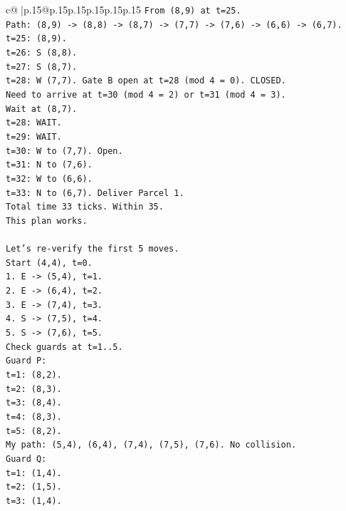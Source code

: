 \documentclass{article}
\begin{document}
{\begin{supertabular}{c@{$\;$}|p{.15\linewidth}@{}p{.15\linewidth}p{.15\linewidth}p{.15\linewidth}p{.15\linewidth}p{.15\linewidth}}
{{{\texttt{From (8,9) at t=25.} \\
\texttt{Path: (8,9) {-}> (8,8) {-}> (8,7) {-}> (7,7) {-}> (7,6) {-}> (6,6) {-}> (6,7).} \\
\texttt{t=25: (8,9).} \\
\texttt{t=26: S (8,8).} \\
\texttt{t=27: S (8,7).} \\
\texttt{t=28: W (7,7). Gate B open at t=28 (mod 4 = 0). CLOSED.} \\
\texttt{Need to arrive at t=30 (mod 4 = 2) or t=31 (mod 4 = 3).} \\
\texttt{Wait at (8,7).} \\
\texttt{t=28: WAIT.} \\
\texttt{t=29: WAIT.} \\
\texttt{t=30: W to (7,7). Open.} \\
\texttt{t=31: N to (7,6).} \\
\texttt{t=32: W to (6,6).} \\
\texttt{t=33: N to (6,7). Deliver Parcel 1.} \\
\texttt{Total time 33 ticks. Within 35.} \\
\texttt{This plan works.} \\
\\ 
\texttt{Let's re{-}verify the first 5 moves.} \\
\texttt{Start (4,4), t=0.} \\
\texttt{1. E {-}> (5,4), t=1.} \\
\texttt{2. E {-}> (6,4), t=2.} \\
\texttt{3. E {-}> (7,4), t=3.} \\
\texttt{4. S {-}> (7,5), t=4.} \\
\texttt{5. S {-}> (7,6), t=5.} \\
\texttt{Check guards at t=1..5.} \\
\texttt{Guard P:} \\
\texttt{t=1: (8,2).} \\
\texttt{t=2: (8,3).} \\
\texttt{t=3: (8,4).} \\
\texttt{t=4: (8,3).} \\
\texttt{t=5: (8,2).} \\
\texttt{My path: (5,4), (6,4), (7,4), (7,5), (7,6). No collision.} \\
\texttt{Guard Q:} \\
\texttt{t=1: (1,4).} \\
\texttt{t=2: (1,5).} \\
\texttt{t=3: (1,4).} \\
}}}
\end{supertabular}}
\end{document}

